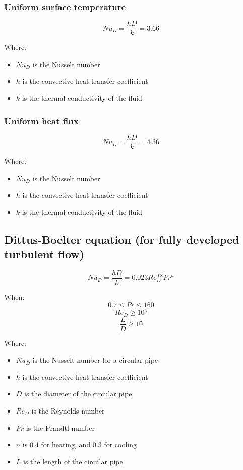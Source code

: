 \documentclass[11pt]{article}
\begin{document}
\subsubsection{Uniform surface temperature}
\label{sec:org5b28c2c}
\[Nu_D = \frac{hD}{k} = 3.66\]

Where:
\begin{itemize}
\item \(Nu_D\) is the Nusselt number
\item \(h\) is the convective heat transfer coefficient
\item \(k\) is the thermal conductivity of the fluid
\end{itemize}
\subsubsection{Uniform heat flux}
\label{sec:orgff0af4f}
\[Nu_D = \frac{hD}{k} = 4.36\]

Where:
\begin{itemize}
\item \(Nu_D\) is the Nusselt number
\item \(h\) is the convective heat transfer coefficient
\item \(k\) is the thermal conductivity of the fluid
\end{itemize}

 \newpage
\subsection{Dittus-Boelter equation (for fully developed turbulent flow)}
\label{sec:org158df14}
\[Nu_D = \frac{hD}{k} = 0.023 Re_D^{0.8} Pr^n\]

When:
\[0.7 \le Pr \le 160\]
\[Re_D \ge 10^4\]
\[\frac{L}{D} \ge 10\]

Where:
\begin{itemize}
\item \(Nu_D\) is the Nusselt number for a circular pipe
\item \(h\) is the convective heat transfer coefficient
\item \(D\) is the diameter of the circular pipe
\item \(Re_D\) is the Reynolds number
\item \(Pr\) is the Prandtl number
\item \(n\) is \(0.4\) for heating, and \(0.3\) for cooling
\item \(L\) is the length of the circular pipe
\end{itemize}
\end{document}
